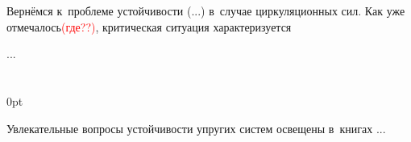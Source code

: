 
\begin{otherlanguage}{russian}

Вернёмся к~проблеме устойчивости (...) в~случае циркуляционных сил. Как уже отмечалось\textcolor{red}{(где??)}, критическая ситуация характеризуется

...



\end{otherlanguage}

\section*{\small \wordforbibliography}

\begin{changemargin}{\parindent}{0pt}
\fontsize{10}{12}\selectfont

\begin{otherlanguage}{russian}

Увлекательные вопросы устойчивости упругих систем освещены в~книгах ...

\end{otherlanguage}

\end{changemargin}
